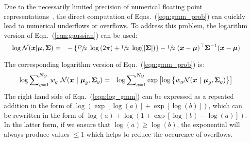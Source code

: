 Due to the necessarily limited precision of numerical floating point representations~\cite{Goldberg_1991,Monniaux_2008},
the direct computation of Eqns.~(\ref{eqn:gmm_prob}) can quickly lead to numerical underflows or overflows.
To address this problem, the logarithm version of Eqn.~(\ref{eqn:gaussian}) can be used:
%
\begin{eqnarray}
  \log {{\mathcal{N}}}( {\boldsymbol{x}} | {\boldsymbol{\mu}}, {\boldsymbol{\Sigma}} )
  & = &
  - \left\{
  \sfrac{D}{2} ~ \log \left( 2\pi \right)
  +
  \sfrac{1}{2} ~ \log ( |{\boldsymbol{\Sigma}}| )
  \right\}
  -
  \sfrac{1}{2} ~ ({\boldsymbol{x}}-{\boldsymbol{\mu}})^\top {\boldsymbol{\Sigma}}^{-1} ({\boldsymbol{x}}-{\boldsymbol{\mu}})
\end{eqnarray}

The corresponding logarithm version of Eqn.~(\ref{eqn:gmm_prob}) is:
%
\begin{eqnarray}
\log \sum\nolimits_{g=1}^{N_G} w_g ~ {{\mathcal{N}}}( {\boldsymbol{x}} ~|~ {\boldsymbol{\mu}}_g, {\boldsymbol{\Sigma}}_g )
& = &
\log \sum\nolimits_{g=1}^{N_G} \exp\left[ \log \left\{ w_g {{\mathcal{N}}}( {\boldsymbol{x}} ~|~ {\boldsymbol{\mu}}_g, {\boldsymbol{\Sigma}}_g ) \right\} \right]
\label{eqn:log_gmm}
\end{eqnarray}
The right hand side of Eqn.~(\ref{eqn:log_gmm}) can be expressed as a repeated addition in the form of \mbox{\small $\log(\exp\left[\log(a)\right] + \exp\left[\log(b)\right])$},
which can be rewritten in the form of \mbox{\small $\log(a) + \log\left( 1 + \exp\left[ \log(b) - \log(a) \right] \right)$}.
In the latter form, if we ensure that {\small $\log(a) \geq \log(b)$},
the exponential will always produce values $\leq 1$ which helps to reduce the occurence of overflows.

